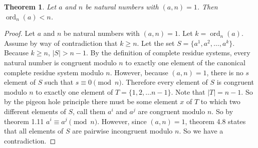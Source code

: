 \documentclass[12pt,leqno]{article}
\numberwithin{equation}{section}
\newtheorem{thm}{Theorem}[section]
\theoremstyle{definition}
\newcommand{\ord}{\operatorname{ord}}
\newcommand{\card}[1]{\left| #1 \right|}
\begin{document}
\pagebreak
\begin{thm}
Let $a$ and $n$ be natural numbers with $(a, n) = 1$. Then
$\ord_n(a) < n$.
\end{thm}
\begin{proof}[Proof]
Let $a$ and $n$ be natural numbers with $(a, n) = 1$. Let $k = \ord_n(a)$.  Assume by way of contradiction that $k \geq n$.  Let the set $S = \{a^1, a^2, \ldots , a^k\}$.  Because $k \geq n$,  $\card{S} > n-1$.  By the definition of complete residue systems, every natural number is congruent modulo $n$ to exactly one element of the canonical complete residue system modulo $n$.  However, because $(a, n) = 1$, there is no $s$ element of $S$ such that $s \equiv 0 \pmod{n}$. Therefore every element of $S$ is congruent modulo $n$ to exactly one element of $T = \{1, 2, \dots n - 1\}$. Note that $\card{T} = n-1$. So by the pigeon hole principle there must be some element $x$ of $T$ to which two different elements of $S$, call them $a^i$ and $a^j$ are congruent modulo $n$.  So by theorem 1.11 $a^i \equiv a^j \pmod{n}$.  However, since $(a, n) = 1$, theorem 4.8 states that all elements of $S$ are pairwise incongruent modulo $n$.  So we have a contradiction.
\end{proof}
\end{document}
